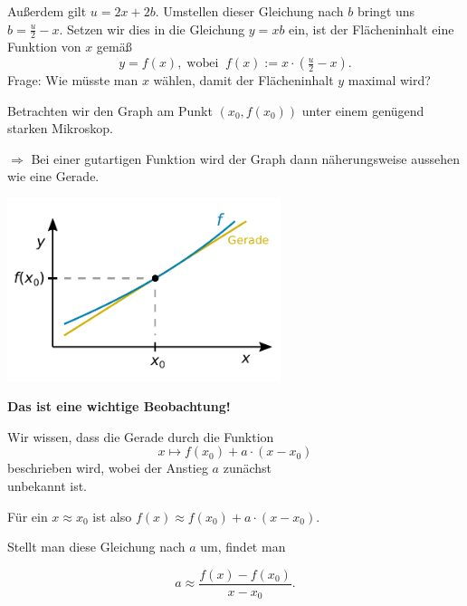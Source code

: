 \documentclass{beamer}
\newcommand{\strong}[1]{\textsf{\textbf{#1}}}
\begin{document}
\begin{frame}
Außerdem gilt $u=2x+2b$. Umstellen dieser Gleichung nach $b$ bringt
uns $b=\tfrac{u}{2}-x$.\pause{}
Setzen wir dies in die Gleichung $y=xb$ ein,
ist der Flächeninhalt eine Funktion von $x$ gemäß
\[y = f(x),\;\text{wobei}\;\; f(x) := x\cdot (\tfrac{u}{2}-x).\]
\pause
Frage: Wie müsste man $x$ wählen, damit der Flächeninhalt $y$
maximal wird? 
\end{frame}

\begin{frame}[t]
\vspace{1em}

Betrachten wir den Graph am Punkt $(x_0,f(x_0))$ unter einem
genügend starken Mikroskop.\pause

\vspace{0.5em}
$\Longrightarrow$ Bei einer gutartigen Funktion wird der Graph dann
näherungsweise aussehen wie eine Gerade.\pause

\vspace{-1em}
\begin{center}
\includegraphics[width=80mm]{img/Funktion-Tangente.pdf}
\end{center}
\end{frame}

\begin{frame}
\strong{Das ist eine wichtige Beobachtung!}
\end{frame}

\begin{frame}
Wir wissen, dass die Gerade durch die Funktion
\[x\mapsto f(x_0)+a\cdot (x-x_0)\]
beschrieben wird, wobei der Anstieg $a$ zunächst\\
unbekannt ist.\pause

\vspace{0.8em}
Für ein $x\approx x_0$ ist also $f(x)\approx f(x_0)+a\cdot (x-x_0)$.
\pause

\vspace{0.8em}
Stellt man diese Gleichung nach $a$ um,\pause{} findet man

\[a \approx \frac{f(x)-f(x_0)}{x-x_0}.\]
\end{frame}
\end{document}
